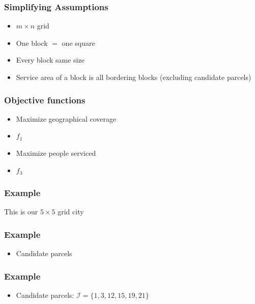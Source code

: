 \documentclass[10pt, compress]{beamer}
\begin{document}
\begin{frame}[fragile]
\frametitle{Simplifying Assumptions}
\begin{itemize}[<+- | alert@+>]
\item $m \times n$ grid
\item One block $=$ one square
\item Every block same size
\item Service area of a block is all bordering blocks (excluding candidate parcels)
\end{itemize}
\end{frame}

\begin{frame}[fragile]
\frametitle{Objective functions}
\begin{itemize}[<+- | alert@+>]
\item Maximize geographical coverage
\item[] $f_1$ 
\item Maximize people serviced
\item[] $f_3$
\end{itemize}
\end{frame}

\begin{frame}[fragile]
  \frametitle{Example}
  \begin{center}
 \end{center}
This is our $5\times5$ grid city

\end{frame}


\begin{frame}[fragile]
  \frametitle{Example}
  \begin{center}
\end{center}
\begin{itemize}
\item Candidate parcels
\end{itemize}
\end{frame}

\begin{frame}[fragile]
  \frametitle{Example}
  \begin{center}
\end{center}
\begin{itemize}
\item Candidate parcels: $\mathcal{I} = \{1,3,12,15,19,21\}$
\end{itemize}
\end{frame}
\end{document}
